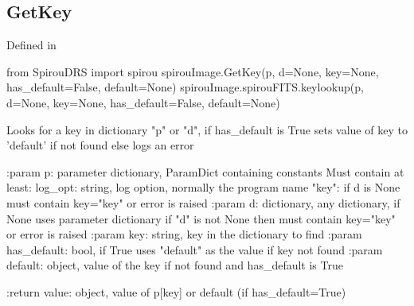 \begin{minipage}{\textwidth}
\subsection{GetKey}

Defined in \spirouImage{}

\begin{pythonbox}
from SpirouDRS import spirou
spirouImage.GetKey(p, d=None, key=None, has_default=False, default=None)
spirouImage.spirouFITS.keylookup(p, d=None, key=None, has_default=False, default=None)
\end{pythonbox}

\begin{pythondocstring}
Looks for a key in dictionary "p" or "d", if has_default is True sets
value of key to 'default' if not found else logs an error

:param p: parameter dictionary, ParamDict containing constants
    Must contain at least:
            log_opt: string, log option, normally the program name
            "key": if d is None must contain key="key" or error is raised
:param d: dictionary, any dictionary, if None uses parameter dictionary
          if "d" is not None then must contain key="key" or error is raised
:param key: string, key in the dictionary to find
:param has_default: bool, if True uses "default" as the value if key
                    not found
:param default: object, value of the key if not found and
                has_default is True

:return value: object, value of p[key] or default (if has_default=True)
\end{pythondocstring}
\end{minipage}


